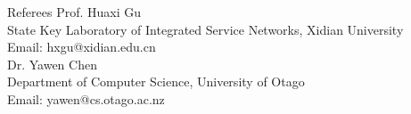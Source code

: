 \documentclass{resume} %
\begin{document}





\begin{rSection}{Referees}
Prof. Huaxi Gu \\
State Key Laboratory of Integrated Service Networks, Xidian University \\
Email: hxgu@xidian.edu.cn\\

Dr. Yawen Chen \\
Department of Computer Science, University of Otago \\
Email: yawen@cs.otago.ac.nz 


\end{rSection}

\end{document}
